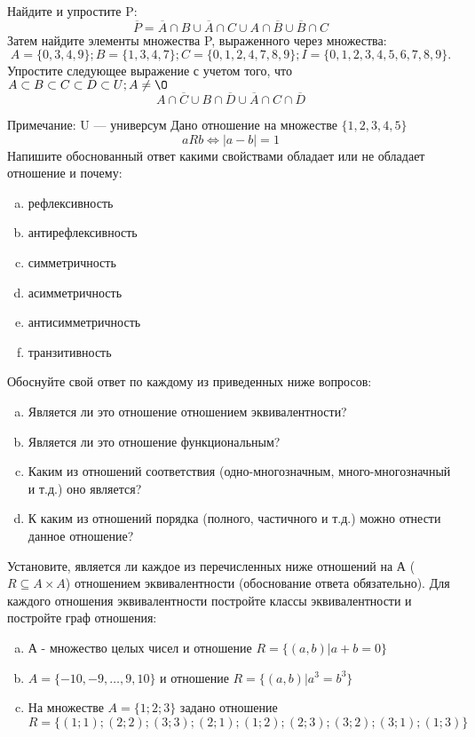 \documentclass[10pt]{exam}
\begin{document}
\begin{questions}
\question
Найдите и упростите P:
\begin{equation*}
\overline{P} = \overline{A} \cap B \cup \overline{A} \cap C \cup A \cap \overline{B} \cup \overline{B} \cap C
\end{equation*}
Затем найдите элементы множества P, выраженного через множества:
\begin{equation*}
A = \{0, 3, 4, 9\}; 
B = \{1, 3, 4, 7\};
C = \{0, 1, 2, 4, 7, 8, 9\};
I = \{0, 1, 2, 3, 4, 5, 6, 7, 8, 9\}.
\end{equation*}\question
Упростите следующее выражение с учетом того, что $A\subset B \subset C \subset D \subset U; A \neq \O$
\begin{equation*}
A \cap  \overline{C} \cup B \cap \overline{D} \cup  \overline{A} \cap C \cap  \overline{D}
\end{equation*}

Примечание: U — универсум\question
Дано отношение на множестве $\{1, 2, 3, 4, 5\}$ 
\begin{equation*}
aRb \iff |a-b| = 1
\end{equation*}
Напишите обоснованный ответ какими свойствами обладает или не обладает отношение и почему:   
\begin{enumerate} [a)]\setcounter{enumi}{0}
\item рефлексивность
\item антирефлексивность
\item симметричность
\item асимметричность
\item антисимметричность
\item транзитивность
\end{enumerate}

Обоснуйте свой ответ по каждому из приведенных ниже вопросов:
\begin{enumerate} [a)]\setcounter{enumi}{0}
    \item Является ли это отношение отношением эквивалентности?
    \item Является ли это отношение функциональным?
    \item Каким из отношений соответствия (одно-многозначным, много-многозначный и т.д.) оно является?
    \item К каким из отношений порядка (полного, частичного и т.д.) можно отнести данное отношение?
\end{enumerate}

\question
Установите, является ли каждое из перечисленных ниже отношений на А ($R \subseteq A \times A$) отношением эквивалентности (обоснование ответа обязательно). Для каждого отношения эквивалентности 
постройте классы эквивалентности и постройте граф отношения:
\begin{enumerate}[a)]\setcounter{enumi}{0}
\item А - множество целых чисел и отношение $R = \{(a,b)|a + b = 0\}$
\item $A = \{-10, -9, …, 9, 10\}$ и отношение $R = \{(a,b)|a^{3} = b^{3}\}$
\item На множестве $A = \{1; 2; 3\}$ задано отношение $R = \{(1; 1); (2; 2); (3; 3); (2; 1); (1; 2); (2; 3); (3; 2); (3; 1); (1; 3)\}$


\end{enumerate}
\end{questions}
\end{document}
